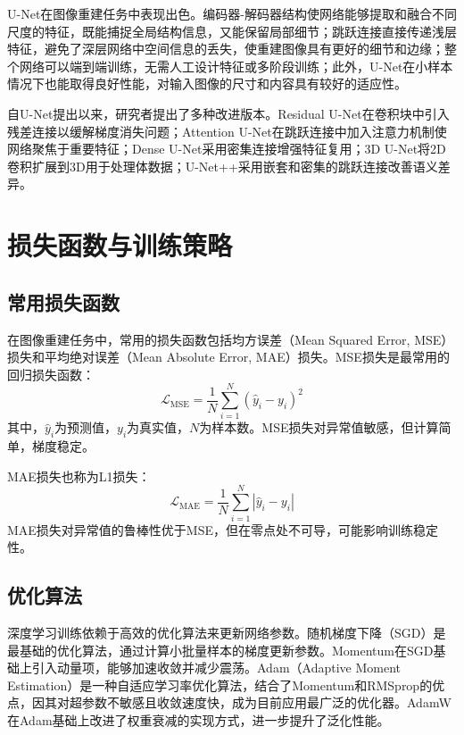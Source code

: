 {U-Net在图像重建任务中表现出色。编码器-解码器结构使网络能够提取和融合不同尺度的特征，既能捕捉全局结构信息，又能保留局部细节；跳跃连接直接传递浅层特征，避免了深层网络中空间信息的丢失，使重建图像具有更好的细节和边缘；整个网络可以端到端训练，无需人工设计特征或多阶段训练；此外，U-Net在小样本情况下也能取得良好性能，对输入图像的尺寸和内容具有较好的适应性。

自U-Net提出以来，研究者提出了多种改进版本。Residual U-Net\citep{zhang2018road}在卷积块中引入残差连接以缓解梯度消失问题；Attention U-Net\citep{oktay2018attention}在跳跃连接中加入注意力机制使网络聚焦于重要特征；Dense U-Net\citep{li2018h}采用密集连接增强特征复用；3D U-Net\citep{cicek20163d}将2D卷积扩展到3D用于处理体数据；U-Net++\citep{zhou2018unet++}采用嵌套和密集的跳跃连接改善语义差异。


\section{损失函数与训练策略}\label{sec:training}

\subsection{常用损失函数}

在图像重建任务中，常用的损失函数包括均方误差（Mean Squared Error, MSE）损失和平均绝对误差（Mean Absolute Error, MAE）损失。MSE损失是最常用的回归损失函数：
\begin{equation}
\mathcal{L}_{\text{MSE}} = \frac{1}{N}\sum_{i=1}^{N}(\hat{y}_i - y_i)^2
\end{equation}
其中，$\hat{y}_i$为预测值，$y_i$为真实值，$N$为样本数。MSE损失对异常值敏感，但计算简单，梯度稳定。

MAE损失也称为L1损失：
\begin{equation}
\mathcal{L}_{\text{MAE}} = \frac{1}{N}\sum_{i=1}^{N}|\hat{y}_i - y_i|
\end{equation}
MAE损失对异常值的鲁棒性优于MSE，但在零点处不可导，可能影响训练稳定性。

\subsection{优化算法}

深度学习训练依赖于高效的优化算法来更新网络参数\citep{ruder2016overview}。随机梯度下降（SGD）\citep{robbins1951stochastic}是最基础的优化算法，通过计算小批量样本的梯度更新参数。Momentum\citep{polyak1964momentum}在SGD基础上引入动量项，能够加速收敛并减少震荡。Adam（Adaptive Moment Estimation）\citep{kingma2014adam}是一种自适应学习率优化算法，结合了Momentum和RMSprop的优点，因其对超参数不敏感且收敛速度快，成为目前应用最广泛的优化器。AdamW\citep{loshchilov2019adamw}在Adam基础上改进了权重衰减的实现方式，进一步提升了泛化性能。

}
